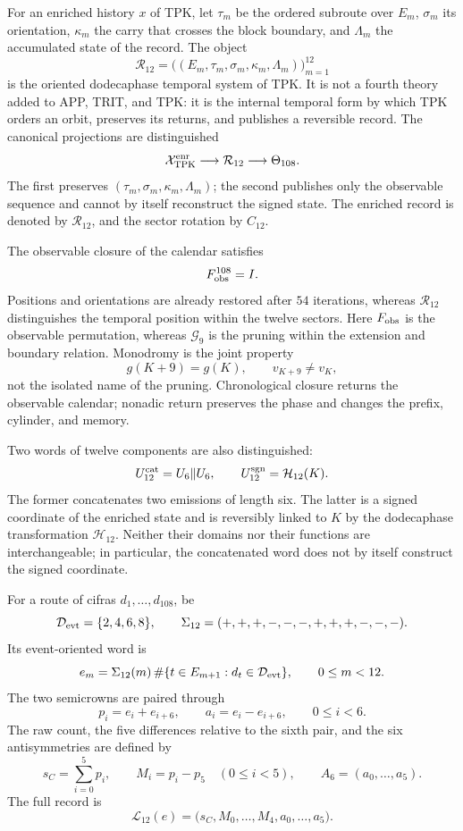 For an enriched history \(x\) of TPK, let \(\tau_m\) be the ordered
subroute over \(E_m\), \(\sigma_m\) its orientation, \(\kappa_m\) the carry
that crosses the block boundary, and \(\Lambda_m\) the accumulated state of the
record. The object
\[
 \mathcal R_{12}
 =\bigl((E_m,\tau_m,\sigma_m,\kappa_m,\Lambda_m)\bigr)_{m=1}^{12}
\]
is the oriented dodecaphase temporal system of TPK. It is not a fourth
theory added to APP, TRIT, and TPK: it is the internal temporal form by which
TPK orders an orbit, preserves its returns, and publishes a reversible
record. The canonical projections are distinguished
\[
 \mathcal X_{\rm TPK}^{\rm enr}
 \longrightarrow \mathcal R_{12}
 \longrightarrow \Theta_{108}.
\]
The first preserves \((\tau_m,\sigma_m,\kappa_m,\Lambda_m)\); the second
publishes only the observable sequence and cannot by itself reconstruct the
signed state. The enriched record is denoted by \(\mathcal R_{12}\), and the
sector rotation by \(C_{12}\).

The observable closure of the calendar satisfies
\[
 F_{\rm obs}^{108}=I.
\]
Positions and orientations are already restored after \(54\) iterations,
whereas \(\mathcal R_{12}\) distinguishes the temporal position within the
twelve sectors. Here \(F_{\rm obs}\) is the observable permutation, whereas
\(\mathcal G_9\) is the pruning within the extension and boundary relation.
Monodromy is the joint property
\[
 g(K+9)=g(K),\qquad v_{K+9}\ne v_K,
\]
not the isolated name of the pruning. Chronological closure returns the observable
calendar; nonadic return preserves the phase and changes the prefix, cylinder,
and memory.

Two words of twelve components are also distinguished:
\[
 U_{12}^{\rm cat}=U_6\Vert U_6,
 \qquad
 U_{12}^{\rm sgn}=\mathcal H_{12}(K).
\]
The former concatenates two emissions of length six. The latter is a signed coordinate of the enriched state and is reversibly linked to \(K\) by the dodecaphase transformation \(\mathcal H_{12}\). Neither their domains nor their functions are interchangeable; in particular, the concatenated word does not by itself construct the signed coordinate.

\begin{definition}
\label{def:registro-dodecafasico-rev7}
For a route of cifras \(d_1,\ldots,d_{108}\), be
\[
 \mathcal D_{\rm evt}=\{2,4,6,8\},\qquad
 \Sigma_{12}=(+,+,+,-,-,-,+,+,+,-,-,-).
\]
Its event-oriented word is
\[
 e_m=\Sigma_{12}(m)\,
 \#\{t\in E_{m+1}:d_t\in\mathcal D_{\rm evt}\},
 \qquad 0\le m<12.
\]
The two semicrowns are paired through
\[
 p_i=e_i+e_{i+6},\qquad
 a_i=e_i-e_{i+6},\qquad 0\le i<6.
\]
The raw count, the five differences relative to the sixth pair, and
the six antisymmetries are defined by
\[
 s_C=\sum_{i=0}^{5}p_i,\qquad
 M_i=p_i-p_5\quad(0\le i<5),\qquad
 A_6=(a_0,\ldots,a_5).
\]
The full record is
\[
 \mathscr L_{12}(e)
 =\bigl(s_C,M_0,\ldots,M_4,a_0,\ldots,a_5\bigr).
\]
\end{definition}

